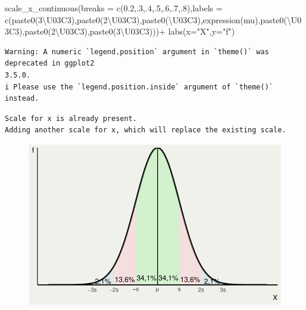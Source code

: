 \documentclass[
  letterpaper,
  DIV=11,
  numbers=noendperiod]{scrartcl}
\newenvironment{Shaded}{\begin{snugshade}}{\end{snugshade}}
\newcommand{\AttributeTok}[1]{\textcolor[rgb]{0.40,0.45,0.13}{#1}}
\newcommand{\DecValTok}[1]{\textcolor[rgb]{0.68,0.00,0.00}{#1}}
\newcommand{\FloatTok}[1]{\textcolor[rgb]{0.68,0.00,0.00}{#1}}
\newcommand{\FunctionTok}[1]{\textcolor[rgb]{0.28,0.35,0.67}{#1}}
\newcommand{\NormalTok}[1]{\textcolor[rgb]{0.00,0.23,0.31}{#1}}
\newcommand{\SpecialCharTok}[1]{\textcolor[rgb]{0.37,0.37,0.37}{#1}}
\newcommand{\StringTok}[1]{\textcolor[rgb]{0.13,0.47,0.30}{#1}}
\begin{document}
\begin{Shaded}
\begin{Highlighting}[]
  \FunctionTok{scale\_x\_continuous}\NormalTok{(}\AttributeTok{breaks =} \FunctionTok{c}\NormalTok{(}\FloatTok{0.2}\NormalTok{,.}\DecValTok{3}\NormalTok{,.}\DecValTok{4}\NormalTok{,.}\DecValTok{5}\NormalTok{,.}\DecValTok{6}\NormalTok{,.}\DecValTok{7}\NormalTok{,.}\DecValTok{8}\NormalTok{),}\AttributeTok{labels =} \FunctionTok{c}\NormalTok{(}\FunctionTok{paste0}\NormalTok{(}\StringTok{\textquotesingle{}{-}3\textbackslash{}U03C3\textquotesingle{}}\NormalTok{),}\FunctionTok{paste0}\NormalTok{(}\StringTok{\textquotesingle{}{-}2\textbackslash{}U03C3\textquotesingle{}}\NormalTok{),}\FunctionTok{paste0}\NormalTok{(}\StringTok{\textquotesingle{}{-}\textbackslash{}U03C3\textquotesingle{}}\NormalTok{),}\FunctionTok{expression}\NormalTok{(mu),}\FunctionTok{paste0}\NormalTok{(}\StringTok{\textquotesingle{}\textbackslash{}U03C3\textquotesingle{}}\NormalTok{),}\FunctionTok{paste0}\NormalTok{(}\StringTok{\textquotesingle{}2\textbackslash{}U03C3\textquotesingle{}}\NormalTok{),}\FunctionTok{paste0}\NormalTok{(}\StringTok{\textquotesingle{}3\textbackslash{}U03C3\textquotesingle{}}\NormalTok{)))}\SpecialCharTok{+}
  \FunctionTok{labs}\NormalTok{(}\AttributeTok{x=}\StringTok{"X"}\NormalTok{,}\AttributeTok{y=}\StringTok{"f"}\NormalTok{)}
\end{Highlighting}
\end{Shaded}

\begin{verbatim}
Warning: A numeric `legend.position` argument in `theme()` was deprecated in ggplot2
3.5.0.
i Please use the `legend.position.inside` argument of `theme()` instead.
\end{verbatim}

\begin{verbatim}
Scale for x is already present.
Adding another scale for x, which will replace the existing scale.
\end{verbatim}

\begin{figure}[H]

{\centering \includegraphics{index_files/figure-pdf/unnamed-chunk-17-1.pdf}

}

\end{figure}
\end{document}
